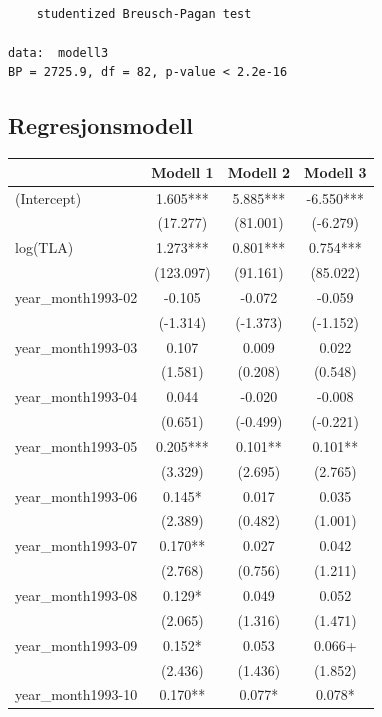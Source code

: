 \documentclass[
  norsk,
  a4paper,
]{article}
\begin{document}
\begin{verbatim}

    studentized Breusch-Pagan test

data:  modell3
BP = 2725.9, df = 82, p-value < 2.2e-16
\end{verbatim}

\subsection{Regresjonsmodell}\label{regresjonsmodell}

\begin{table}
\fontsize{12.0pt}{14.0pt}\selectfont
\begin{tabular*}{\linewidth}{@{\extracolsep{\fill}}lccc}
\toprule
  & Modell 1 & Modell 2 & Modell 3 \\ 
\midrule\addlinespace[2.5pt]
(Intercept) & 1.605*** & 5.885*** & -6.550*** \\ 
 & (17.277) & (81.001) & (-6.279) \\ 
log(TLA) & 1.273*** & 0.801*** & 0.754*** \\ 
 & (123.097) & (91.161) & (85.022) \\ 
year\_month1993-02 & -0.105 & -0.072 & -0.059 \\ 
 & (-1.314) & (-1.373) & (-1.152) \\ 
year\_month1993-03 & 0.107 & 0.009 & 0.022 \\ 
 & (1.581) & (0.208) & (0.548) \\ 
year\_month1993-04 & 0.044 & -0.020 & -0.008 \\ 
 & (0.651) & (-0.499) & (-0.221) \\ 
year\_month1993-05 & 0.205*** & 0.101** & 0.101** \\ 
 & (3.329) & (2.695) & (2.765) \\ 
year\_month1993-06 & 0.145* & 0.017 & 0.035 \\ 
 & (2.389) & (0.482) & (1.001) \\ 
year\_month1993-07 & 0.170** & 0.027 & 0.042 \\ 
 & (2.768) & (0.756) & (1.211) \\ 
year\_month1993-08 & 0.129* & 0.049 & 0.052 \\ 
 & (2.065) & (1.316) & (1.471) \\ 
year\_month1993-09 & 0.152* & 0.053 & 0.066+ \\ 
 & (2.436) & (1.436) & (1.852) \\ 
year\_month1993-10 & 0.170** & 0.077* & 0.078* \\ 

\end{tabular*}
\end{table}
\end{document}
